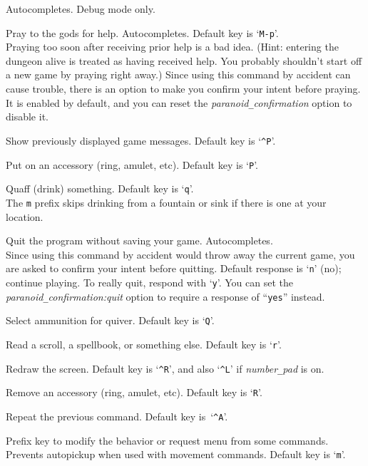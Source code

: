 Autocompletes.
Debug mode only.
\item[\tb{\#pray}]
Pray to the gods for help. Autocompletes. Default key is `{\tt M-p}'.\\
Praying too soon after receiving prior help is a bad idea.
(Hint: entering the dungeon alive is treated as having received help.
You probably shouldn't start off a new game by praying right away.)
Since using this command by accident can cause trouble, there is an
option to make you confirm your intent before praying.  It is enabled
by default, and you can reset the
{\it paranoid\verb+_+confirmation\/}
option to disable it.
\item[\tb{\#prevmsg}]
Show previously displayed game messages. Default key is `{\tt \^{}P}'.
\item[\tb{\#puton}]
Put on an accessory (ring, amulet, etc). Default key is `{\tt P}'.
\item[\tb{\#quaff}]
Quaff (drink) something. Default key is `{\tt q}'.\\
The {\tt m} prefix skips drinking from a fountain or sink if there
is one at your location.
\item[\tb{\#quit}]
Quit the program without saving your game. Autocompletes.\\
Since using this command by accident would throw away the current game,
you are asked to confirm your intent before quitting.
Default response is `{\tt n}' (no); continue playing.
To really quit, respond with `{\tt y}'.
You can set the
{\it paranoid\verb+_+confirmation:quit\/}
option to require a response of ``{\tt yes}'' instead.
\item[\tb{\#quiver}]
Select ammunition for quiver. Default key is `{\tt Q}'.
\item[\tb{\#read}]
Read a scroll, a spellbook, or something else. Default key is `{\tt r}'.
\item[\tb{\#redraw}]
Redraw the screen.
Default key is `{\tt \^{}R}',
and also `{\tt \^{}L}' if {\it number\verb+_+pad\/} is on.
\item[\tb{\#remove}]
Remove an accessory (ring, amulet, etc). Default key is `{\tt R}'.
\item[{\tb{\#repeat}}]
Repeat the previous command.
Default key is~`{\tt \^{}A}'.
\item[\tb{\#reqmenu}]
Prefix key to modify the behavior or request menu from some commands.
Prevents autopickup when used with movement commands.
Default key is `{\tt m}'.
\item[\tb{\#retravel}]
